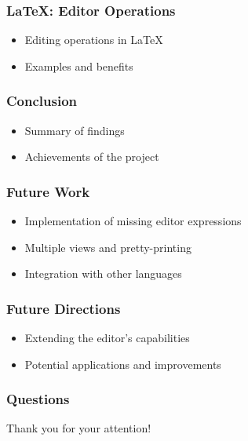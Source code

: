 \documentclass[t,24pt,aspectratio=169]{beamer}
\begin{document}
\begin{frame}[hvid]
    \frametitle{LaTeX: Editor Operations}
    \begin{itemize}
        \item Editing operations in LaTeX
        \item Examples and benefits
    \end{itemize}
\end{frame}

\begin{frame}[hvid]
    \frametitle{Conclusion}
    \begin{itemize}
        \item Summary of findings
        \item Achievements of the project
    \end{itemize}
\end{frame}

\begin{frame}[hvid]
    \frametitle{Future Work}
    \begin{itemize}
        \item Implementation of missing editor expressions
        \item Multiple views and pretty-printing
        \item Integration with other languages
    \end{itemize}
\end{frame}

\begin{frame}[hvid]
    \frametitle{Future Directions}
    \begin{itemize}
        \item Extending the editor's capabilities
        \item Potential applications and improvements
    \end{itemize}
\end{frame}

\begin{frame}[hvid]
    \frametitle{Questions}
    \centering
    \large{Thank you for your attention!}
\end{frame}
\end{document}
